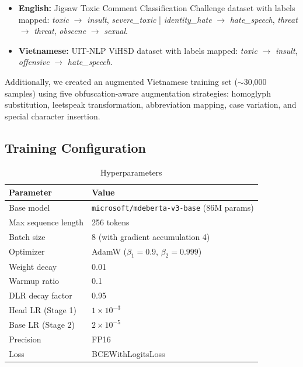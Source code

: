 \documentclass[12pt,a4paper]{article}
\begin{document}
\begin{itemize}[leftmargin=*]
    \item \textbf{English:} Jigsaw Toxic Comment Classification Challenge dataset with labels mapped: \textit{toxic} $\rightarrow$ \textit{insult}, \textit{severe\_toxic} | \textit{identity\_hate} $\rightarrow$ \textit{hate\_speech}, \textit{threat} $\rightarrow$ \textit{threat}, \textit{obscene} $\rightarrow$ \textit{sexual}.
    \item \textbf{Vietnamese:} UIT-NLP ViHSD dataset \cite{nguyen2020hate} with labels mapped: \textit{toxic} $\rightarrow$ \textit{insult}, \textit{offensive} $\rightarrow$ \textit{hate\_speech}.
\end{itemize}

Additionally, we created an augmented Vietnamese training set ($\sim$30,000 samples) using five obfuscation-aware augmentation strategies: homoglyph substitution, leetspeak transformation, abbreviation mapping, case variation, and special character insertion.

\subsection{Training Configuration}

\begin{table}[htbp]
    \centering
    \caption{Hyperparameters}
    \label{tab:hyperparams}
    \begin{tabular}{@{}ll@{}}
        \toprule
        \textbf{Parameter} & \textbf{Value} \\
        \midrule
        Base model         & \texttt{microsoft/mdeberta-v3-base} (86M params) \\
        Max sequence length & 256 tokens \\
        Batch size         & 8 (with gradient accumulation 4) \\
        Optimizer          & AdamW ($\beta_1=0.9$, $\beta_2=0.999$) \\
        Weight decay       & 0.01 \\
        Warmup ratio       & 0.1 \\
        DLR decay factor   & 0.95 \\
        Head LR (Stage 1)  & $1 \times 10^{-3}$ \\
        Base LR (Stage 2)  & $2 \times 10^{-5}$ \\
        Precision          & FP16 \\
        Loss               & BCEWithLogitsLoss \\
        \bottomrule
    \end{tabular}
\end{table}
\end{document}
